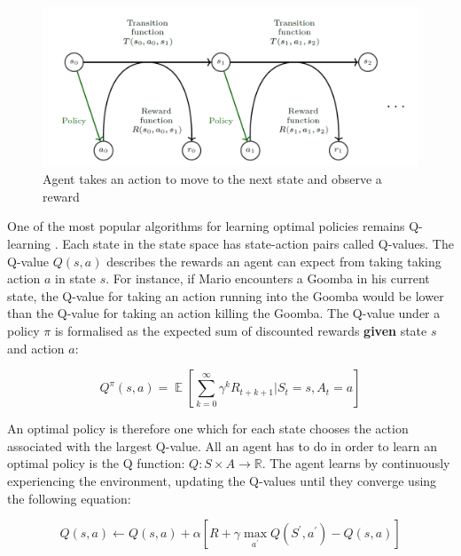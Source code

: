 \documentclass[notitlepage,a4paper,11pt]{article}
\newcommand{\R}{\mathbb{R}}
\DeclareMathOperator{\E}{\mathbb{E}}
\begin{document}
\begin{figure}[!htb]
\centering
\includegraphics[width=.5\linewidth]{figs/mdp_detail.png}
\caption{Agent takes an action to move to the next state and observe a reward \protect\cite{franccois2018introduction}} \label{fig:2}
\end{figure}

One of the most popular algorithms for learning optimal policies remains Q-learning \cite{watkins1992q}. Each state in the state space has state-action pairs called Q-values. The Q-value $Q(s,a)$ describes the rewards an agent can expect from taking taking action $a$ in state $s$. For instance, if Mario encounters a Goomba in his current state, the Q-value for taking an action running into the Goomba would be lower than the Q-value for taking an action killing the Goomba. The Q-value under a policy $\pi$ is formalised as the expected sum of discounted rewards \textbf{given} state $s$ and action $a$:

\[ 
 Q^\pi(s, a) = \E \left[ \sum_{k=0}^{\infty} \gamma^k R_{t+k+1} \Big| S_t = s, A_t = a \right]
\]

An optimal policy is therefore one which for each state chooses the action associated with the largest Q-value. All an agent has to do in order to learn an optimal policy is the Q function: $Q : S \times A \to \R$. The agent learns by continuously experiencing the environment, updating the Q-values until they converge using the following equation:

\[
	Q(s,a) \gets Q(s,a) + \alpha \left[ R + \gamma \max\limits_{a^\prime} Q(S^\prime, a^\prime) - Q(s,a) \right] 
\]
\end{document}
